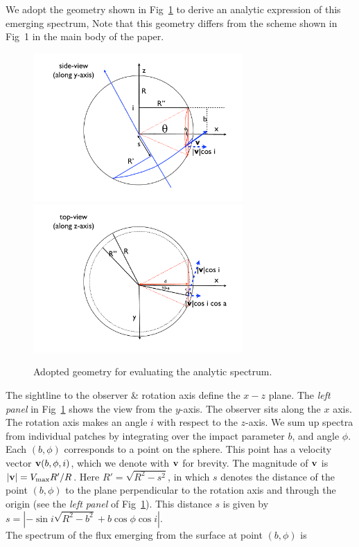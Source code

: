\documentclass{emulateapj}
\begin{document}
We adopt the geometry shown in Fig~\ref{fig:scheme} to derive an analytic expression of this emerging spectrum,
Note that this geometry differs from the scheme shown in Fig~1 in the main body of
the paper. 
%
\begin{figure}[h]
\centerline{\includegraphics[width=80mm]{fig11a.pdf}
\includegraphics[width=80mm]{fig11b.pdf}}
\caption[]{Adopted geometry for evaluating the analytic spectrum.}
\label{fig:scheme}
\end{figure} 
%
The sightline to the observer \& rotation axis define the $x-z$ plane. 
The {\it left panel} in Fig~\ref{fig:scheme} shows the view from the $y$-axis. 
The observer sits along the $x$ axis. 
The rotation axis makes an angle $i$ with respect to the $z$-axis. 
We sum up spectra from individual patches by integrating over the
impact parameter $b$, and angle $\phi$. 
Each $(b,\phi)$ corresponds to a point on the sphere. 
This point has a velocity vector ${\bf v}(b,\phi,i)$, which we denote
with ${\bf v}$ for brevity. The magnitude of ${\bf v}$ is $|{\bf v}|=V_{\rm max}R'/R$. Here $R'=\sqrt{R^2 -s^2}$, in which $s$ denotes the distance of the point $(b,\phi)$ to the plane perpendicular to the rotation axis and through the origin (see the {\it left panel} of Fig~\ref{fig:scheme}). This distance $s$ is given by $s=|-\sin i\sqrt{R^2-b^2}+ b \cos \phi \cos i|$.\\

The spectrum of the flux emerging from the surface at point $(b,\phi)$ is 
\end{document}
